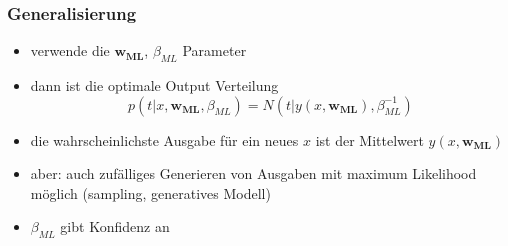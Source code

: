 	\subsubsection{Generalisierung}
	\begin{itemize}
		\item verwende die $\pmb{w_{ML}}$, $\beta_{ML}$ Parameter
		\item dann ist die optimale Output Verteilung
		\begin{equation*}
			p(t\vert x, \pmb{w_{ML}}, \beta_{ML}) = N(t\vert y(x, \pmb{w_{ML}}), \beta^{-1}_{ML})
		\end{equation*}
	\item die wahrscheinlichste Ausgabe für ein neues $x$ ist der Mittelwert $y(x, \pmb{w_{ML}})$
	\item aber: auch zufälliges Generieren von Ausgaben mit maximum Likelihood möglich (sampling, generatives Modell)
	\item $\beta_{ML}$ gibt Konfidenz an
	\end{itemize}
